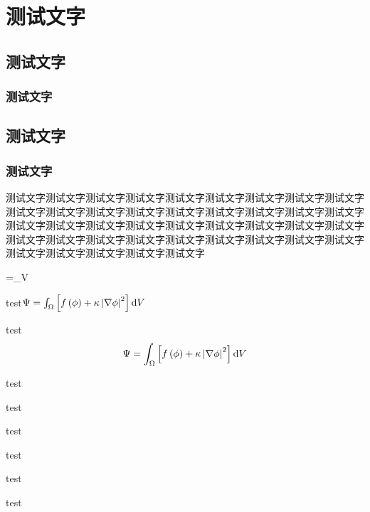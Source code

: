 
\section{测试文字}

\makeatletter
{}
\makeatother
\lipsum



\subsection{测试文字}
\subsubsection{测试文字}


\subsection{测试文字}
\subsubsection{测试文字}


\begin{Example}
	测试文字测试文字测试文字测试文字测试文字测试文字测试文字测试文字测试文字测试文字测试文字测试文字测试文字测试文字测试文字测试文字测试文字测试文字测试文字测试文字测试文字测试文字测试文字测试文字测试文字测试文字测试文字测试文字测试文字测试文字测试文字测试文字测试文字测试文字测试文字测试文字测试文字测试文字测试文字测试文字测试文字
	\begin{flalign}
		\Psi=\int_\Omega{}V
	\end{flalign}
\end{Example}




\Improve
\begin{QuestionItem}[2]
	\item test$\Psi=\int_\Omega\left[f\left(\phi\right)+\kappa\left|\nabla\phi\right|^2\right]{\rm d}V$
	\item test
	$$\Psi=\int_\Omega\left[f\left(\phi\right)+\kappa\left|\nabla\phi\right|^2\right]{\rm d}V$$
	\item test
	\item test
	\item test
	\item test
	\item test
	\item test
\end{QuestionItem}


